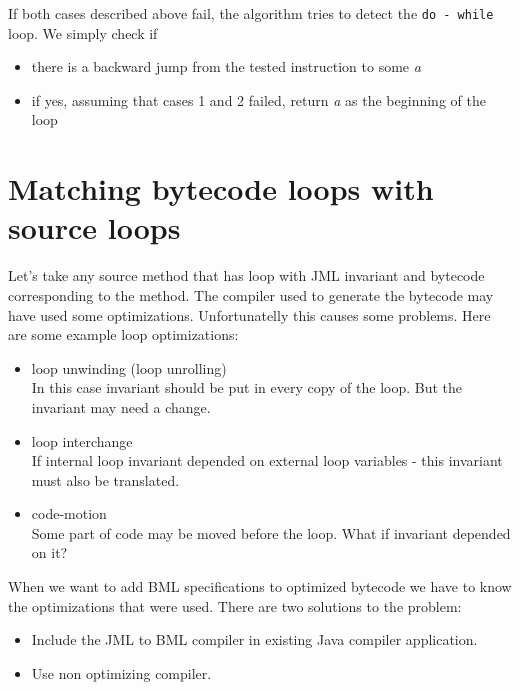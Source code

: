 \documentclass{acm_proc_article-sp}
\begin{document}
If both cases described above fail, the algorithm tries to detect the \texttt{do - while} loop. We simply check if
\begin{itemize}
\item{there is a backward jump from the tested instruction to some \textit{a}}
\item{if yes, assuming that cases 1 and 2 failed, return \textit{a} as the beginning of the loop}
\end{itemize}

\section{Matching bytecode loops with source loops}
Let's take any source method that has loop with JML invariant and bytecode corresponding to the method. The compiler used to generate the bytecode may have used some optimizations. Unfortunatelly this causes some problems. Here are some example loop optimizations:
\begin{itemize}
	\item loop unwinding (loop unrolling)\\
In this case invariant should be put in every copy of the loop. But the invariant may need a change.
	\item loop interchange\\
If internal loop invariant depended on external loop variables - this invariant must also be translated.
	\item code-motion\\
Some part of code may be moved before the loop. What if invariant depended on it?
\end{itemize}
When we want to add BML specifications to optimized bytecode we have to know the optimizations that were used. There are two solutions to the problem:
\begin{itemize}
	\item Include the JML to BML compiler in existing Java compiler application.
	\item Use non optimizing compiler.
\end{itemize}
\end{document}
